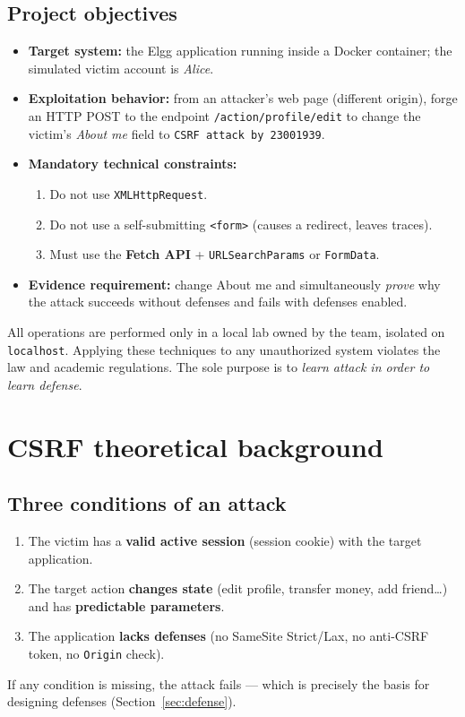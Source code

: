 \documentclass[11pt,a4paper]{article}
\begin{document}
\subsection{Project objectives}
\begin{itemize}
  \item \textbf{Target system:} the Elgg application running inside a Docker container; the simulated victim account is \emph{Alice}.
  \item \textbf{Exploitation behavior:} from an attacker's web page (different origin), forge an HTTP POST to the endpoint \texttt{/action/profile/edit} to change the victim's \emph{About me} field to \texttt{CSRF attack by 23001939}.
  \item \textbf{Mandatory technical constraints:}
  \begin{enumerate}
    \item \no{} Do not use \texttt{XMLHttpRequest}.
    \item \no{} Do not use a self-submitting \texttt{<form>} (causes a redirect, leaves traces).
    \item \yes{} Must use the \textbf{Fetch API} + \texttt{URLSearchParams} or \texttt{FormData}.
  \end{enumerate}
  \item \textbf{Evidence requirement:} change About me and simultaneously \emph{prove} why the attack succeeds without defenses and fails with defenses enabled.
\end{itemize}

\begin{warnbox}
All operations are performed only in a local lab owned by the team, isolated on \texttt{localhost}. Applying these techniques to any unauthorized system violates the law and academic regulations. The sole purpose is to \emph{learn attack in order to learn defense}.
\end{warnbox}

\section{CSRF theoretical background}
\subsection{Three conditions of an attack}
\begin{enumerate}
  \item The victim has a \textbf{valid active session} (session cookie) with the target application.
  \item The target action \textbf{changes state} (edit profile, transfer money, add friend\ldots) and has \textbf{predictable parameters}.
  \item The application \textbf{lacks defenses} (no SameSite Strict/Lax, no anti-CSRF token, no \texttt{Origin} check).
\end{enumerate}
If any condition is missing, the attack fails — which is precisely the basis for designing defenses (Section~\ref{sec:defense}).
\end{document}
